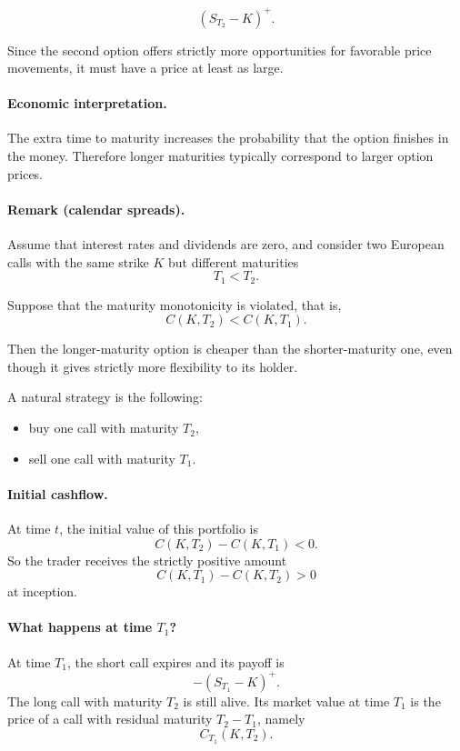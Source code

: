 \documentclass[11pt]{article}
\newcommand{\1}{\mathbf{1}}
\theoremstyle{plain}
\theoremstyle{definition}
\theoremstyle{remark}
\begin{document}
\[
(S_{T_2}-K)^+ .
\]

Since the second option offers strictly more opportunities for
favorable price movements, it must have a price at least as large.

\paragraph{Economic interpretation.}

The extra time to maturity increases the probability that the option
finishes in the money.
Therefore longer maturities typically correspond to larger option prices.

\paragraph{Remark (calendar spreads).}

Assume that interest rates and dividends are zero, and consider two
European calls with the same strike \(K\) but different maturities
\[
T_1 < T_2.
\]

Suppose that the maturity monotonicity is violated, that is,
\[
C(K,T_2) < C(K,T_1).
\]

Then the longer-maturity option is cheaper than the shorter-maturity one,
even though it gives strictly more flexibility to its holder.

A natural strategy is the following:
\begin{itemize}[leftmargin=1.4em]
    \item buy one call with maturity \(T_2\),
    \item sell one call with maturity \(T_1\).
\end{itemize}

\paragraph{Initial cashflow.}
At time \(t\), the initial value of this portfolio is
\[
C(K,T_2)-C(K,T_1)<0.
\]
So the trader receives the strictly positive amount
\[
C(K,T_1)-C(K,T_2)>0
\]
at inception.

\paragraph{What happens at time \(T_1\)?}
At time \(T_1\), the short call expires and its payoff is
\[
-(S_{T_1}-K)^+.
\]
The long call with maturity \(T_2\) is still alive. Its market value at
time \(T_1\) is the price of a call with residual maturity \(T_2-T_1\),
namely
\[
C_{T_1}(K,T_2).
\]
\end{document}
